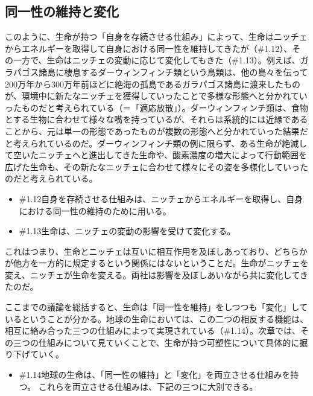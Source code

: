 \subsection{同一性の維持と変化}\label{ux540cux4e00ux6027ux306eux7dadux6301ux3068ux5909ux5316}

このように、生命が持つ「自身を存続させる仕組み」によって、生命はニッチェからエネルギーを取得して自身における同一性を維持してきたが（\#1.12）、その一方で、生命はニッチェの変動に応じて変化してもきた（\#1.13）。例えば、ガラパゴス諸島に棲息するダーウィンフィンチ類という鳥類は、他の島々を伝って200万年から300万年前ほどに絶海の孤島であるガラパゴス諸島に渡来したものが、環境中に新たなニッチェを獲得していったことで多様な形態へと分かれていったものだと考えられている（＝「適応放散」）。ダーウィンフィンチ類は、食物とする生物に合わせて様々な嘴を持っているが、それらは系統的には近縁であることから、元は単一の形態であったものが複数の形態へと分かれていった結果だと考えられているのだ。ダーウィンフィンチ類の例に限らず、ある生命が絶滅して空いたニッチェへと進出してきた生命や、酸素濃度の増大によって行動範囲を広げた生命も、その新たなニッチェに合わせて様々にその姿を多様化していったのだと考えられている。

\begin{note}{}
  \begin{itemize}
    \tightlist
    \item{\#1.12}自身を存続させる仕組みは、ニッチェからエネルギーを取得し、自身における同一性の維持のために用いる。
    \item{\#1.13}生命は、ニッチェの変動の影響を受けて変化する。
  \end{itemize}
\end{note}

これはつまり、生命とニッチェは互いに相互作用を及ぼしあっており、どちらかが他方を一方的に規定するという関係にはないということだ。生命がニッチェを変え、ニッチェが生命を変える。両社は影響を及ぼしあいながら共に変化してきたのだ。

ここまでの議論を総括すると、生命は「同一性を維持」をしつつも「変化」しているということが分かる。地球の生命においては、この二つの相反する機能は、相互に絡み合った三つの仕組みによって実現されている（\#1.14）。次章では、その三つの仕組みについて見ていくことで、生命が持つ可塑性について具体的に掘り下げていく。

\begin{note}{}
  \begin{itemize}
    \tightlist
    \item{\#1.14}地球の生命は、「同一性の維持」と「変化」を両立させる仕組みを持つ。 これらを両立させる仕組みは、下記の三つに大別できる。
  \end{itemize}
\end{note}

